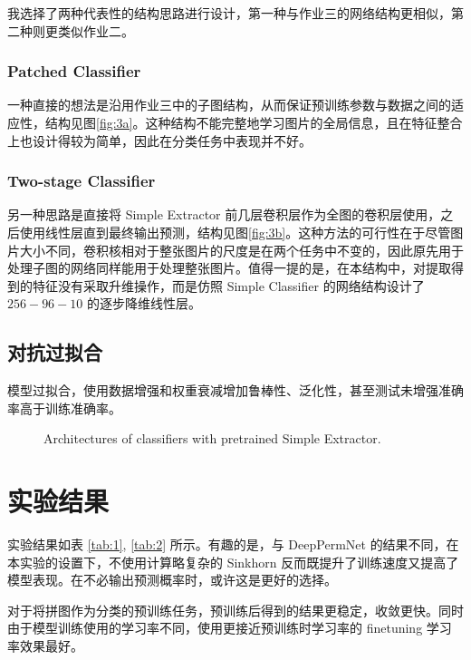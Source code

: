 \documentclass[a4paper]{article}
\begin{document}
我选择了两种代表性的结构思路进行设计，第一种与作业三的网络结构更相似，第二种则更类似作业二。
\subsubsection{Patched Classifier}
一种直接的想法是沿用作业三中的子图结构，从而保证预训练参数与数据之间的适应性，结构见图\ref{fig:3a}。这种结构不能完整地学习图片的全局信息，且在特征整合上也设计得较为简单，因此在分类任务中表现并不好。
\subsubsection{Two-stage Classifier}
另一种思路是直接将 Simple Extractor 前几层卷积层作为全图的卷积层使用，之后使用线性层直到最终输出预测，结构见图\ref{fig:3b}。这种方法的可行性在于尽管图片大小不同，卷积核相对于整张图片的尺度是在两个任务中不变的，因此原先用于处理子图的网络同样能用于处理整张图片。值得一提的是，在本结构中，对提取得到的特征没有采取升维操作，而是仿照 Simple Classifier 的网络结构设计了 $256-96-10$ 的逐步降维线性层。

\subsection{对抗过拟合}
模型过拟合，使用数据增强和权重衰减增加鲁棒性、泛化性，甚至测试未增强准确率高于训练准确率。

\begin{figure}[H]
    \centering
    
    \caption{Architectures of classifiers with pretrained Simple Extractor.}
\end{figure}



\section{实验结果}
实验结果如表 \ref{tab:1}, \ref{tab:2} 所示。有趣的是，与 DeepPermNet \cite{deeppermnet} 的结果不同，在本实验的设置下，不使用计算略复杂的 Sinkhorn 反而既提升了训练速度又提高了模型表现。在不必输出预测概率时，或许这是更好的选择。

对于将拼图作为分类的预训练任务，预训练后得到的结果更稳定，收敛更快。同时由于模型训练使用的学习率不同，使用更接近预训练时学习率的 finetuning 学习率效果最好。
\end{document}
